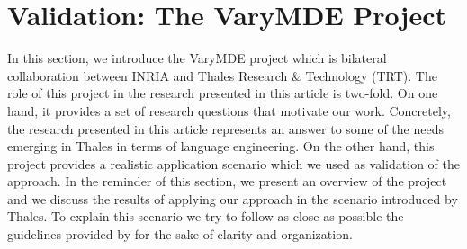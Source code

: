 \section{Validation: The VaryMDE Project}
\label{sec:validation}

In this section, we introduce the VaryMDE project which is bilateral collaboration between INRIA and Thales Research \& Technology (TRT). The role of this project in the research presented in this article is two-fold. On one hand, it provides a set of research questions that motivate our work. Concretely, the research presented in this article represents an answer to some of the needs emerging in Thales in terms of language engineering. On the other hand, this project provides a realistic application scenario which we used as validation of the approach. In the reminder of this section, we present an overview of the project and we discuss the results of applying our approach in the scenario introduced by Thales. To explain this scenario we try to follow as close as possible the guidelines provided by \cite{runeson-book} for the sake of clarity and organization.



